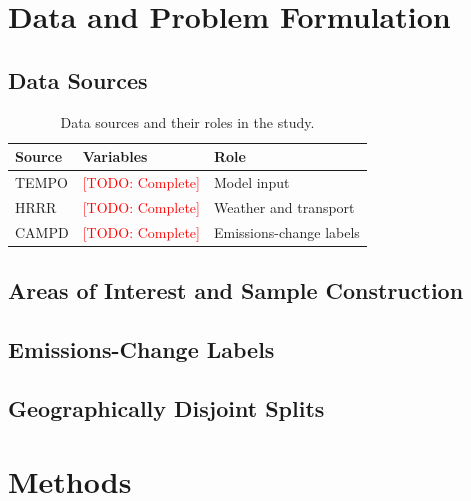 \documentclass[11pt]{article}
\newcommand{\todo}[1]{\textcolor{red}{[TODO: #1]}}
\begin{document}
\section{Data and Problem Formulation}
\label{sec:data}

\subsection{Data Sources}

\begin{table}[t]
  \centering
  \caption{Data sources and their roles in the study.}
  \label{tab:data-sources}
  \begin{tabular}{lll}
    \toprule
    Source & Variables & Role \\
    \midrule
    TEMPO & \todo{Complete} & Model input \\
    HRRR & \todo{Complete} & Weather and transport \\
    CAMPD & \todo{Complete} & Emissions-change labels \\
    \bottomrule
  \end{tabular}
\end{table}

\subsection{Areas of Interest and Sample Construction}

\subsection{Emissions-Change Labels}

\subsection{Geographically Disjoint Splits}

\section{Methods}
\label{sec:methods}
\end{document}
